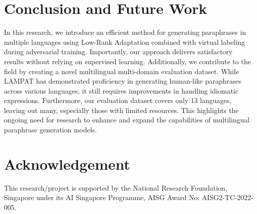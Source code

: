\documentclass[letterpaper]{article} %
\begin{document}
\section{Conclusion and Future Work}
In this research, we introduce an efficient method for generating paraphrases in multiple languages using Low-Rank Adaptation combined with virtual labeling during adversarial training. Importantly, our approach delivers satisfactory results without relying on supervised learning. Additionally, we contribute to the field by creating a novel multilingual multi-domain evaluation dataset. While LAMPAT has demonstrated proficiency in generating human-like paraphrases across various languages, it still requires improvements in handling idiomatic expressions. Furthermore, our evaluation dataset covers only 13 languages, leaving out many, especially those with limited resources. This highlights the ongoing need for research to enhance and expand the capabilities of multilingual paraphrase generation models.

\section{Acknowledgement}
This research/project is supported by the National Research Foundation, Singapore under its AI Singapore Programme, AISG Award No: AISG2-TC-2022-005.





\end{document}

